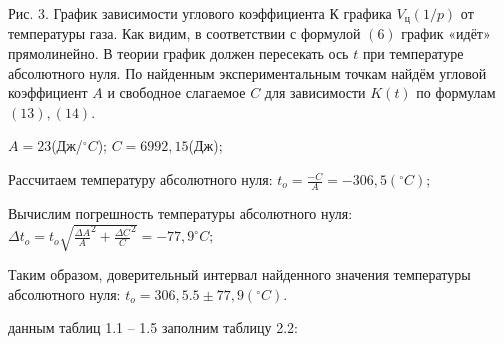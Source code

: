 \documentclass[12pt]{article}
\begin{document}
\begin{enumerate}
\par\bigskip\par\bigskip\par\bigskip\par\bigskip\par\bigskip\par\bigskip\par\bigskip\par\bigskip\par\bigskip\par\bigskip\par\bigskip\par\bigskip\par\bigskip\par\bigskip\par\bigskip\par\bigskip\par\bigskip\par\bigskip\par\bigskip\par\bigskip\par\bigskip\par\bigskip\par\bigskip\par\bigskip\par\bigskip\par\bigskip\par\bigskip\par\bigskip            
Рис. 3. График зависимости углового коэффициента $К$  графика $V_{ц}(1/p)$ от температуры газа.
Как видим, в соответствии с формулой $(6)$ график «идёт» прямолинейно.
В теории график должен пересекать ось $t$ при температуре абсолютного нуля. По найденным экспериментальным точкам найдём угловой коэффициент $A$ и свободное слагаемое $C$ для зависимости $K(t)$ по формулам $(13), (14)$.

	$A = 23 $(Дж/$^{\circ}C$);
	$C = 6992,15 $(Дж);

Рассчитаем температуру абсолютного нуля:
 $t_{o} = \frac{-C}{A}=-306,5(^{\circ}C)$;
 
Вычислим погрешность температуры абсолютного нуля: 
$\Delta t_{o} = t_{o} \sqrt{\frac{\Delta A}{A}^2+\frac{\Delta C}{C}^2}  = -77,9^{\circ}C;$
		  
Таким образом, доверительный интервал найденного значения температуры абсолютного нуля: 
 $t_{o}= 306,5.5 \pm 77,9(^{\circ}C).$

 данным таблиц 1.1 – 1.5 заполним таблицу 2.2:


\end{enumerate}
\end{document}
